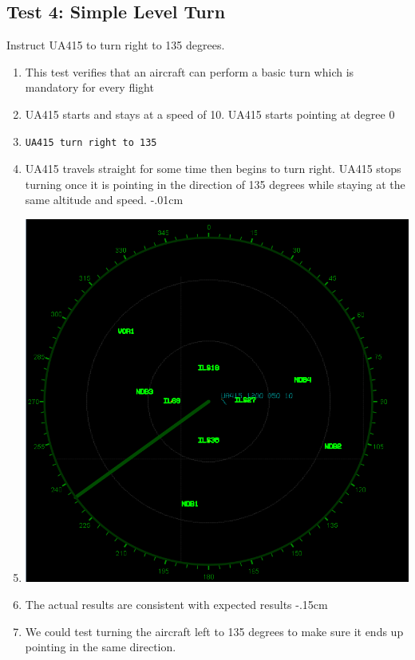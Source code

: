 \documentclass[letterpaper, 12pt]{article}
\begin{document}
\subsection{Test 4: Simple Level Turn}
Instruct UA415 to turn right to 135 degrees.
\begin{enumerate}\itemsep-.15cm
\item This test verifies that an aircraft can perform a basic turn which is mandatory for every flight
\item UA415 starts and stays at a speed of 10. UA415 starts pointing at degree 0
\item \begin{verbatim}UA415 turn right to 135
\end{verbatim}
\item UA415 travels straight for some time then begins to turn right. UA415 stops turning once it is pointing in the direction of 135 degrees while staying at the same altitude and speed.
\itemsep-.01cm
\item \includegraphics[scale=.25,valign=t,center]{test4_1.png}
\item The actual results are consistent with expected results
\itemsep-.15cm
\item We could test turning the aircraft left to 135 degrees to make sure it ends up pointing in the same direction.
\end{enumerate}
\end{document}
